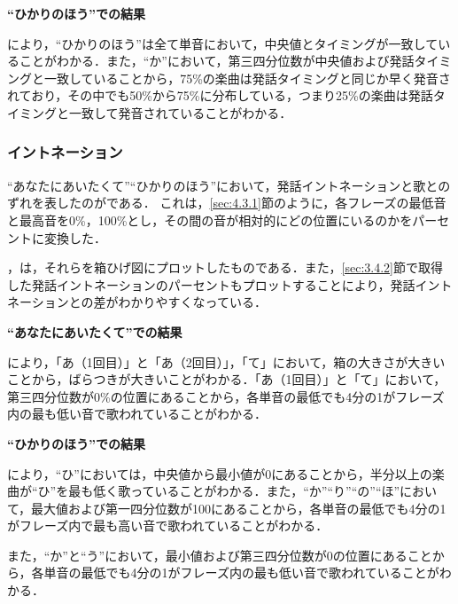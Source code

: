\textbf{“ひかりのほう”での結果}\par
{}により，“ひかりのほう”は全て単音において，中央値とタイミングが一致していることがわかる．また，“か”において，第三四分位数が中央値および発話タイミングと一致していることから，75\%の楽曲は発話タイミングと同じか早く発音されており，その中でも50\%から75\%に分布している，つまり25\%の楽曲は発話タイミングと一致して発音されていることがわかる．\par

\subsubsection{イントネーション}\label{sec:4.3.2}
“あなたにあいたくて”“ひかりのほう”において，発話イントネーションと歌とのずれを表したのがである．
これは，\ref{sec:4.3.1}節のように，各フレーズの最低音と最高音を0\%，100\%とし，その間の音が相対的にどの位置にいるのかをパーセントに変換した．\par
{}，は，それらを箱ひげ図にプロットしたものである．また，\ref{sec:3.4.2}節で取得した発話イントネーションのパーセントもプロットすることにより，発話イントネーションとの差がわかりやすくなっている．\par

\textbf{“あなたにあいたくて”での結果}\par
{}により，「あ（1回目）」と「あ（2回目）」，「て」において，箱の大きさが大きいことから，ばらつきが大きいことがわかる．「あ（1回目）」と「て」において，第三四分位数が0\%の位置にあることから，各単音の最低でも4分の1がフレーズ内の最も低い音で歌われていることがわかる．\par

\textbf{“ひかりのほう”での結果}\par
{}により，“ひ”においては，中央値から最小値が0にあることから，半分以上の楽曲が“ひ”を最も低く歌っていることがわかる．また，“か”“り”“の”“ほ”において，最大値および第一四分位数が100にあることから，各単音の最低でも4分の1がフレーズ内で最も高い音で歌われていることがわかる．\par
また，“か”と“う”において，最小値および第三四分位数が0の位置にあることから，各単音の最低でも4分の1がフレーズ内の最も低い音で歌われていることがわかる．\par

